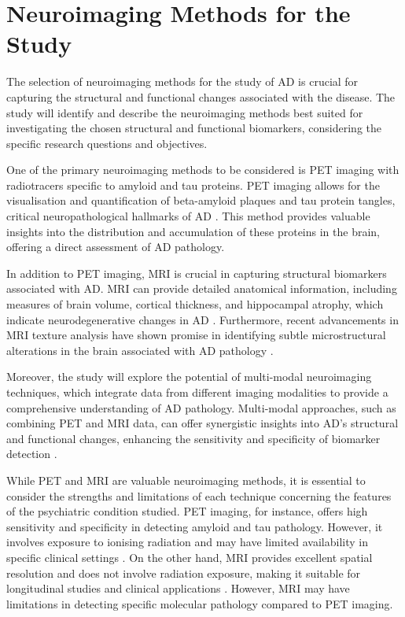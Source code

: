 \documentclass[10pt]{article}
\begin{document}
\begin{sloppypar}
  \section{Neuroimaging Methods for the Study}
  \label{sec:neuroimaging-methods}

  The selection of neuroimaging methods for the study of AD is crucial for capturing the structural and functional changes associated with the disease. The study will identify and describe the neuroimaging methods best suited for investigating the chosen structural and functional biomarkers, considering the specific research questions and objectives.

  One of the primary neuroimaging methods to be considered is PET imaging with radiotracers specific to amyloid and tau proteins. PET imaging allows for the visualisation and quantification of beta-amyloid plaques and tau protein tangles, critical neuropathological hallmarks of AD \citep{jack_serial_2009}. This method provides valuable insights into the distribution and accumulation of these proteins in the brain, offering a direct assessment of AD pathology.

  In addition to PET imaging, MRI is crucial in capturing structural biomarkers associated with AD. MRI can provide detailed anatomical information, including measures of brain volume, cortical thickness, and hippocampal atrophy, which indicate neurodegenerative changes in AD \citep{cai_magnetic_2020}. Furthermore, recent advancements in MRI texture analysis have shown promise in identifying subtle microstructural alterations in the brain associated with AD pathology \citep{cai_magnetic_2020}.

  Moreover, the study will explore the potential of multi-modal neuroimaging techniques, which integrate data from different imaging modalities to provide a comprehensive understanding of AD pathology. Multi-modal approaches, such as combining PET and MRI data, can offer synergistic insights into AD's structural and functional changes, enhancing the sensitivity and specificity of biomarker detection \citep{ran_multimodal_2022}.

  While PET and MRI are valuable neuroimaging methods, it is essential to consider the strengths and limitations of each technique concerning the features of the psychiatric condition studied. PET imaging, for instance, offers high sensitivity and specificity in detecting amyloid and tau pathology. However, it involves exposure to ionising radiation and may have limited availability in specific clinical settings \citep{bao_pet_2021}. On the other hand, MRI provides excellent spatial resolution and does not involve radiation exposure, making it suitable for longitudinal studies and clinical applications \citep{cai_magnetic_2020}. However, MRI may have limitations in detecting specific molecular pathology compared to PET imaging.


\end{sloppypar}
\end{document}
